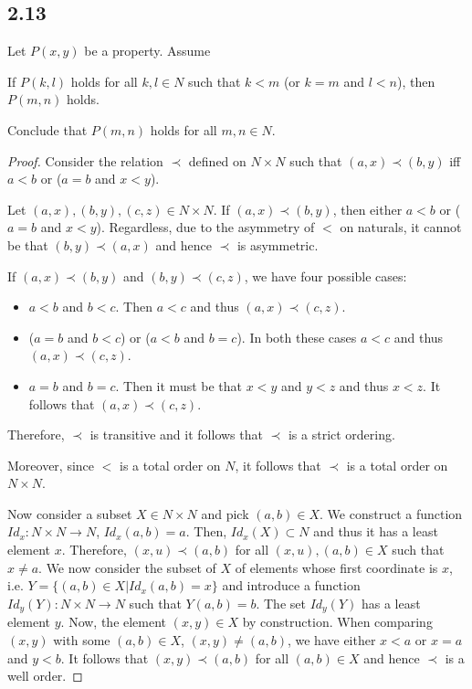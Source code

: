 \subsection*{2.13}

Let $P(x,y)$ be a property. Assume

If $P(k,l)$ holds for all $k,l \in N$ such that $k < m$ (or $k=m$ and $l < n$), then $P(m,n)$ holds.

Conclude that $P(m,n)$ holds for all $m,n \in N$.

\begin{proof}

Consider the relation $\prec$ defined on $N \times N$ such that $(a,x) \prec (b,y)$ iff $a < b$ or ($a = b$ and $x < y$).

Let $(a,x), (b,y), (c,z) \in N \times N$. If $(a,x) \prec (b,y)$, then either $a < b$ or ($a = b$ and $x < y$). Regardless, due to the asymmetry of $<$ on naturals, it cannot be that $(b, y) \prec (a,x)$ and hence $\prec$ is asymmetric. 

If $(a, x) \prec (b,y)$ and $(b, y) \prec (c,z)$, we have four possible cases:

\begin{itemize}
    \item $a < b$ and $b < c$. Then $a < c$ and thus $(a,x) \prec (c,z)$.
    \item ($a = b$ and $b < c$) or ($a < b$ and $b = c$). In both these cases $a < c$ and thus $(a,x) \prec (c,z)$.
    \item $a = b$ and $b = c$. Then it must be that $x < y$ and $y < z$ and thus $x < z$. It follows that $(a,x) \prec (c, z)$.
\end{itemize}

Therefore, $\prec$ is transitive and it follows that $\prec$ is a strict ordering.

Moreover, since $<$ is a total order on $N$, it follows that $\prec$ is a total order on $N \times N$.

\vspace{1em}

Now consider a subset $X \in N \times N$ and pick $(a,b) \in X$. We construct a function $Id_x:N \times N \rightarrow N$, $Id_x(a,b) = a$. Then, $Id_x(X) \subset N$ and thus it has a least element $x$. Therefore, $(x, u) \prec (a,b)$ for all $(x,u), (a,b) \in X$ such that $x \neq a$. We now consider the subset of $X$ of elements whose first coordinate is $x$, i.e. $Y = \{(a, b) \in X| Id_x(a,b)=x\}$ and introduce a function $Id_y(Y):N \times N \rightarrow N$ such that $Y(a,b) = b$. The set $Id_y(Y)$ has a least element $y$. Now, the element $(x,y) \in X$ by construction. When comparing $(x,y)$ with some $(a,b) \in X$, $(x,y) \neq (a,b)$, we have either $x < a$ or $x=a$ and $y < b$. It follows that $(x,y) \prec (a,b)$ for all $(a,b) \in X$ and hence $\prec$ is a well order.


\end{proof}
